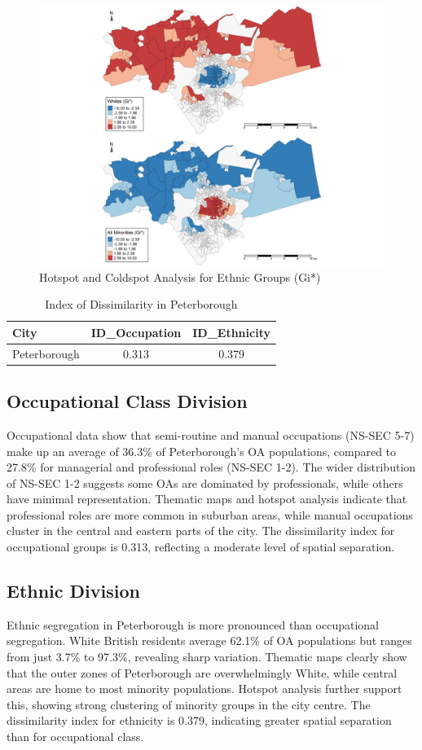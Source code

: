 \documentclass[10pt]{article}
\begin{document}
\begin{multicols}{2}
	\begin{figure}[H]
		\centering
		\includegraphics[width=0.8\linewidth]{ethnicity_gi.png}
		\caption{Hotspot and Coldspot Analysis for Ethnic Groups (Gi*)}
		\label{fig:ethnicity_gi}
	\end{figure}
	
	\begin{table}[H]
		\centering
		\caption{Index of Dissimilarity in Peterborough}
		\label{tab:dissimilarity}
		\begin{tabular}{lcc}
			\toprule
			City & ID\_Occupation & ID\_Ethnicity \\
			\midrule
			Peterborough & 0.313 & 0.379 \\
			\bottomrule
		\end{tabular}
	\end{table}

	\subsection*{Occupational Class Division}
	\indent Occupational data show that semi-routine and manual occupations (NS-SEC 5-7) make up an average of 36.3\% of Peterborough's OA populations, compared to 27.8\% for managerial and professional roles (NS-SEC 1-2). The wider distribution of NS-SEC 1-2 suggests some OAs are dominated by professionals, while others have minimal representation. Thematic maps and hotspot analysis indicate that professional roles are more common in suburban areas, while manual occupations cluster in the central and eastern parts of the city. The dissimilarity index for occupational groups is 0.313, reflecting a moderate level of spatial separation.
	
	\subsection*{Ethnic Division}
	\indent Ethnic segregation in Peterborough is more pronounced than occupational segregation. White British residents average 62.1\% of OA populations but ranges from just 3.7\% to 97.3\%, revealing sharp variation. Thematic maps clearly show that the outer zones of Peterborough are overwhelmingly White, while central areas are home to most minority populations. Hotspot analysis further support this, showing strong clustering of minority groups in the city centre. The dissimilarity index for ethnicity is 0.379, indicating greater spatial separation than for occupational class.
	

\end{multicols}
\end{document}
